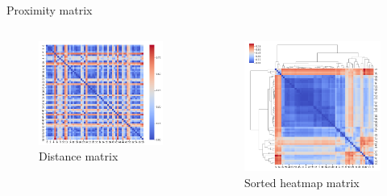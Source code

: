 \documentclass[shortpres]{beamer}
\begin{document}
\begin{frame}{Proximity matrix}
\begin{columns}
\begin{column}{0.5\textwidth}
\begin{figure}[h!]
  \centering
    \includegraphics[width=\textwidth]{heatmap.png}
  \caption{Distance matrix}
\end{figure}
\end{column}
\begin{column}{0.5\textwidth}
\begin{figure}[h!]
	\vspace{-1em}
  \centering
    \includegraphics[width=\textwidth]{map.png}
  \vspace{-2em}
  \caption{Sorted heatmap matrix}
\end{figure}
\end{column}
\end{columns}
\end{frame}
\end{document}
